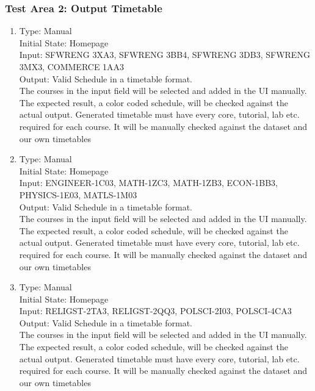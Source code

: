 \documentclass[11pt, oneside]{article}   	%
\begin{document}
\subsubsection{Test Area 2: Output Timetable}
\begin{enumerate}
\item Type: Manual \\
Initial State: Homepage \\
Input: SFWRENG 3XA3, SFWRENG 3BB4, SFWRENG 3DB3, SFWRENG 3MX3, COMMERCE 1AA3 \\
Output: Valid Schedule in a timetable format. \\
The courses in the input field will be selected and added in the UI manually. The expected result, a color coded schedule, will be checked against the actual output. Generated timetable must have every core, tutorial, lab etc. required for each course. It will be manually checked against the dataset and our own timetables \\

\item Type: Manual \\
Initial State: Homepage \\
Input:  ENGINEER-1C03, MATH-1ZC3, MATH-1ZB3,  ECON-1BB3, PHYSICS-1E03, MATLS-1M03 \\
Output: Valid Schedule in a timetable format. \\
The courses in the input field will be selected and added in the UI manually. The expected result, a color coded schedule, will be checked against the actual output. Generated timetable must have every core, tutorial, lab etc. required for each course. It will be manually checked against the dataset and our own timetables \\

\item Type: Manual \\
Initial State: Homepage \\
Input: RELIGST-2TA3, RELIGST-2QQ3, POLSCI-2I03, POLSCI-4CA3\\
Output: Valid Schedule in a timetable format. \\
The courses in the input field will be selected and added in the UI manually. The expected result, a color coded schedule, will be checked against the actual output. Generated timetable must have every core, tutorial, lab etc. required for each course. It will be manually checked against the dataset and our own timetables \\


\end{enumerate}
\end{document}
